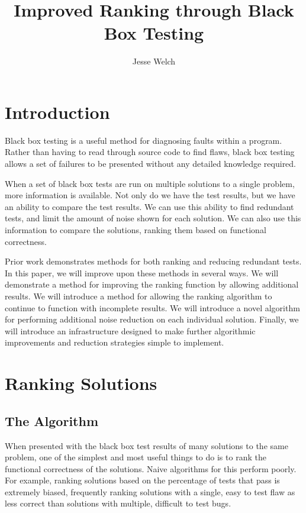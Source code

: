 \documentclass[11pt]{article}
\title{Improved Ranking through Black Box Testing}
\author{Jesse Welch}
\date{}
\begin{document}
\maketitle

\tableofcontents
\newpage

\section{Introduction}
Black box testing is a useful method for diagnosing faults within a program. Rather than having to read through source code to find flaws, black box testing allows a set of failures to be presented without any detailed knowledge required.

When a set of black box tests are run on multiple solutions to a single problem, more information is available. Not only do we have the test results, but we have an ability to compare the test results. We can use this ability to find redundant tests, and limit the amount of noise shown for each solution. We can also use this information to compare the solutions, ranking them based on functional correctness.

Prior work demonstrates methods for both ranking and reducing redundant tests. In this paper, we will improve upon these methods in several ways. We will demonstrate a method for improving the ranking function by allowing additional results. We will introduce a method for allowing the ranking algorithm to continue to function with incomplete results. We will introduce a novel algorithm for performing additional noise reduction on each individual solution. Finally, we will introduce an infrastructure designed to make further algorithmic improvements and reduction strategies simple to implement.

\section{Ranking Solutions}
\subsection{The Algorithm}
When presented with the black box test results of many solutions to the same problem, one of the simplest and most useful things to do is to rank the functional correctness of the solutions. Naive algorithms for this perform poorly. For example, ranking solutions based on the percentage of tests that pass is extremely biased, frequently ranking solutions with a single, easy to test flaw as less correct than solutions with multiple, difficult to test bugs.
\end{document}
